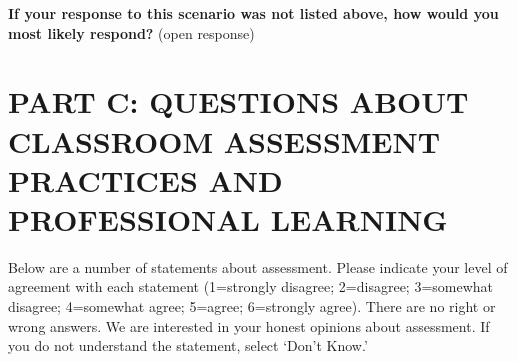 \documentclass[
]{book}
\begin{document}
\textbf{If your response to this scenario was not listed above, how would you most likely respond?} (open response)

\hypertarget{part-c-questions-about-classroom-assessment-practices-and-professional-learning}{%
\section{PART C: QUESTIONS ABOUT CLASSROOM ASSESSMENT PRACTICES AND PROFESSIONAL LEARNING}\label{part-c-questions-about-classroom-assessment-practices-and-professional-learning}}

Below are a number of statements about assessment. Please indicate your level of agreement with each statement (1=strongly disagree; 2=disagree; 3=somewhat disagree; 4=somewhat agree; 5=agree; 6=strongly agree). There are no right or wrong answers. We are interested in your honest opinions about assessment. If you do not understand the statement, select `Don't Know.'
\end{document}
